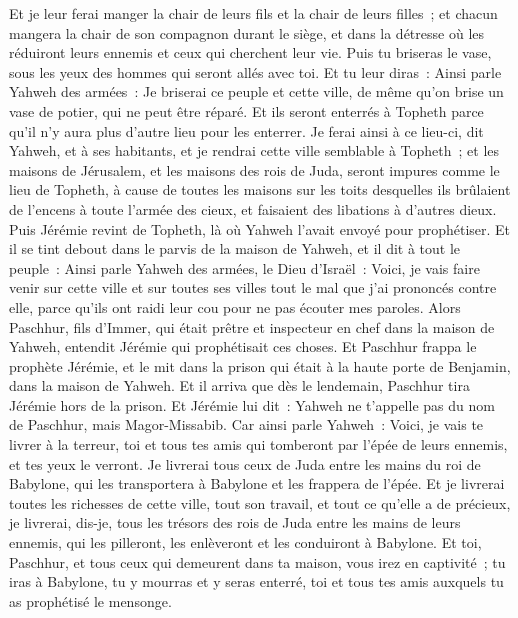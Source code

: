 \begin{multicols}{2}
Et je leur ferai manger la chair de leurs fils et la chair de leurs filles~; et chacun mangera la chair de son compagnon durant le siège, et dans la détresse où les réduiront leurs ennemis et ceux qui cherchent leur vie.
Puis tu briseras le vase, sous les yeux des hommes qui seront allés avec toi.
Et tu leur diras~: Ainsi parle Yahweh des armées~: Je briserai ce peuple et cette ville, de même qu'on brise un vase de potier, qui ne peut être réparé. Et ils seront enterrés à Topheth parce qu'il n'y aura plus d'autre lieu pour les enterrer.
Je ferai ainsi à ce lieu-ci, dit Yahweh, et à ses habitants, et je rendrai cette ville semblable à Topheth~;
et les maisons de Jérusalem, et les maisons des rois de Juda, seront impures comme le lieu de Topheth, à cause de toutes les maisons sur les toits desquelles ils brûlaient de l'encens à toute l'armée des cieux, et faisaient des libations à d'autres dieux.
Puis Jérémie revint de Topheth, là où Yahweh l'avait envoyé pour prophétiser. Et il se tint debout dans le parvis de la maison de Yahweh, et il dit à tout le peuple~:
Ainsi parle Yahweh des armées, le Dieu d'Israël~: Voici, je vais faire venir sur cette ville et sur toutes ses villes tout le mal que j'ai prononcés contre elle, parce qu'ils ont raidi leur cou pour ne pas écouter mes paroles.
\VerseOne{}Alors Paschhur, fils d'Immer, qui était prêtre et inspecteur en chef dans la maison de Yahweh, entendit Jérémie qui prophétisait ces choses.
Et Paschhur frappa le prophète Jérémie, et le mit dans la prison qui était à la haute porte de Benjamin, dans la maison de Yahweh.
Et il arriva que dès le lendemain, Paschhur tira Jérémie hors de la prison. Et Jérémie lui dit~: Yahweh ne t'appelle pas du nom de Paschhur, mais Magor-Missabib.
Car ainsi parle Yahweh~: Voici, je vais te livrer à la terreur, toi et tous tes amis qui tomberont par l'épée de leurs ennemis, et tes yeux le verront. Je livrerai tous ceux de Juda entre les mains du roi de Babylone, qui les transportera à Babylone et les frappera de l'épée.
Et je livrerai toutes les richesses de cette ville, tout son travail, et tout ce qu'elle a de précieux, je livrerai, dis-je, tous les trésors des rois de Juda entre les mains de leurs ennemis, qui les pilleront, les enlèveront et les conduiront à Babylone.
Et toi, Paschhur, et tous ceux qui demeurent dans ta maison, vous irez en captivité~; tu iras à Babylone, tu y mourras et y seras enterré, toi et tous tes amis auxquels tu as prophétisé le mensonge.

\end{multicols}
